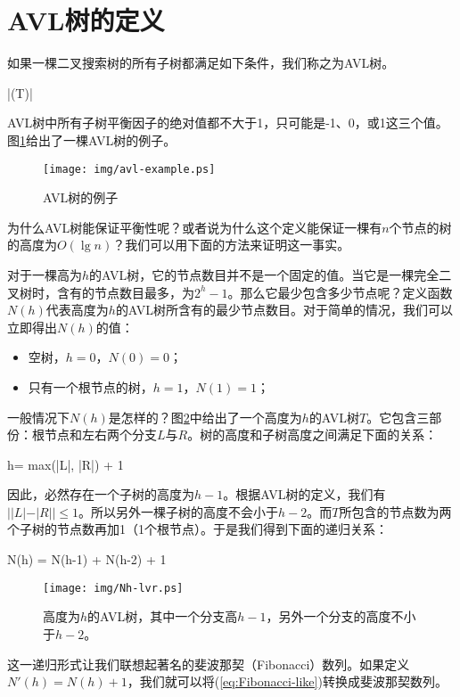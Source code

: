 \documentclass[UTF8]{article}
\begin{document}
\section{AVL树的定义}

如果一棵二叉搜索树的所有子树都满足如下条件，我们称之为AVL树。

\be
  |\delta(T)| 
\ee

AVL树中所有子树平衡因子的绝对值都不大于1，只可能是-1、0，或1这三个值。图\ref{fig:avl-example}给出了一棵AVL树的例子。

\begin{figure}[htbp]
   \centering
   \texttt{[image: img/avl-example.ps]}
   \caption{AVL树的例子} \label{fig:avl-example}
\end{figure}

为什么AVL树能保证平衡性呢？或者说为什么这个定义能保证一棵有$n$个节点的树的高度为$O(\lg n)$？我们可以用下面的方法来证明这一事实。

对于一棵高为$h$的AVL树，它的节点数目并不是一个固定的值。当它是一棵完全二叉树时，含有的节点数目最多，为$2^h-1$。那么它最少包含多少节点呢？定义函数$N(h)$代表高度为$h$的AVL树所含有的最少节点数目。对于简单的情况，我们可以立即得出$N(h)$的值：

\begin{itemize}
\item 空树，$h=0$，$N(0)=0$；
\item 只有一个根节点的树，$h=1$，$N(1)=1$；
\end{itemize}

一般情况下$N(h)$是怎样的？图\ref{fig:N-h-relation}中给出了一个高度为$h$的AVL树$T$。它包含三部份：根节点和左右两个分支$L$与$R$。树的高度和子树高度之间满足下面的关系：

\be
  h= max(|L|, |R|) + 1
\ee

因此，必然存在一个子树的高度为$h-1$。根据AVL树的定义，我们有 $||L| -|R|| \leq 1$。所以另外一棵子树的高度不会小于$h-2$。而$T$所包含的节点数为两个子树的节点数再加1（1个根节点）。于是我们得到下面的递归关系：

\be
  N(h) = N(h-1) + N(h-2) + 1
  \label{eq:Fibonacci-like}
\ee

\begin{figure}[htbp]
   \centering
   \texttt{[image: img/Nh-lvr.ps]}
   \caption{高度为$h$的AVL树，其中一个分支高$h-1$，另外一个分支的高度不小于$h-2$。} \label{fig:N-h-relation}
\end{figure}

这一递归形式让我们联想起著名的斐波那契（Fibonacci）数列。如果定义$N'(h) = N(h)+1$，我们就可以将(\ref{eq:Fibonacci-like})转换成斐波那契数列。
\end{document}
